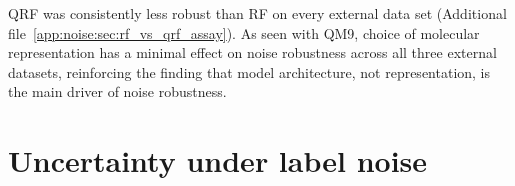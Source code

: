 QRF was consistently less robust than RF on every external data set (Additional file~\ref{app:noise:sec:rf_vs_qrf_assay}). As seen with QM9, choice of molecular representation has a minimal effect on noise robustness across all three external datasets, reinforcing the finding that model architecture, not representation, is the main driver of noise robustness. 

\section{Uncertainty under label noise}\label{sec:uq}

